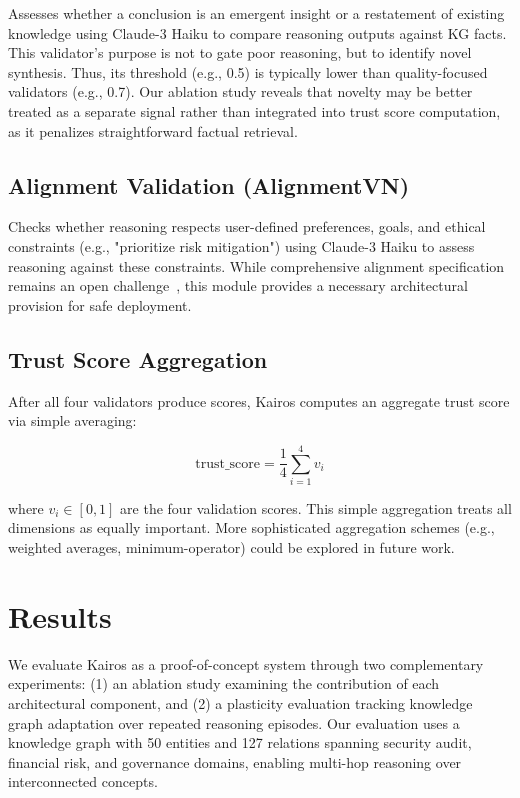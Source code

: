 \documentclass{article}
\begin{document}
Assesses whether a conclusion is an emergent insight or a restatement of existing knowledge using Claude-3 Haiku to compare reasoning outputs against KG facts. This validator's purpose is not to gate poor reasoning, but to identify novel synthesis. Thus, its threshold (e.g., 0.5) is typically lower than quality-focused validators (e.g., 0.7). Our ablation study reveals that novelty may be better treated as a separate signal rather than integrated into trust score computation, as it penalizes straightforward factual retrieval.

\subsection{Alignment Validation (AlignmentVN)}

Checks whether reasoning respects user-defined preferences, goals, and ethical constraints (e.g., "prioritize risk mitigation") using Claude-3 Haiku to assess reasoning against these constraints. While comprehensive alignment specification remains an open challenge~\citep{pan2024unifying}, this module provides a necessary architectural provision for safe deployment.

\subsection{Trust Score Aggregation}

After all four validators produce scores, Kairos computes an aggregate trust score via simple averaging:

\begin{equation}
\text{trust\_score} = \frac{1}{4} \sum_{i=1}^{4} v_i
\end{equation}

where $v_i \in [0,1]$ are the four validation scores. This simple aggregation treats all dimensions as equally important. More sophisticated aggregation schemes (e.g., weighted averages, minimum-operator) could be explored in future work.
\section{Results}

We evaluate Kairos as a proof-of-concept system through two complementary experiments: (1) an ablation study examining the contribution of each architectural component, and (2) a plasticity evaluation tracking knowledge graph adaptation over repeated reasoning episodes. Our evaluation uses a knowledge graph with 50 entities and 127 relations spanning security audit, financial risk, and governance domains, enabling multi-hop reasoning over interconnected concepts.
\end{document}
